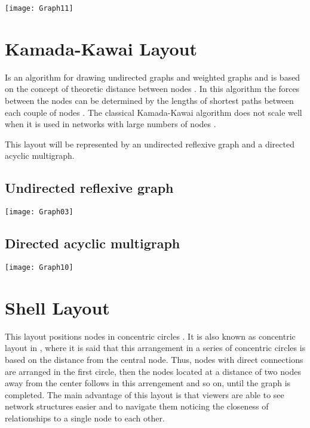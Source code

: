 \documentclass[10pt,a4paper,openany]{article}
\begin{document}
	
	
	\begin{center}
		\texttt{[image: Graph11]}
	\end{center}
	
\newpage	
	
	\section*{Kamada-Kawai Layout}
	Is an algorithm for drawing undirected graphs and weighted graphs and is based on the concept of theoretic distance between nodes \citep{kamada1989algorithm}. In this algorithm the forces between the nodes can be determined by the lengths of shortest paths between each couple of nodes \citep{networkx}. The classical Kamada-Kawai algorithm does not scale well when it is used in networks with large numbers of nodes \citep{DBLP:journals/corr/CheongS15}.
	
	This layout will be represented by an undirected reflexive graph and a directed acyclic multigraph.
	
		\subsection*{Undirected reflexive graph}
		
	
		\begin{center}
			\texttt{[image: Graph03]}
		\end{center}
	
	\newpage
	
		\subsection*{Directed acyclic multigraph}
		

		\begin{center}
			\texttt{[image: Graph10]}
		\end{center}
	
	
\newpage
	
	\section*{Shell Layout}
	This layout positions nodes in concentric circles \citep{networkx}. It is also known as concentric layout in \citep{cherven2015mastering}, where it is said that this arrangement in a series of concentric circles is based on the distance from the central node. Thus, nodes with direct connections are arranged in the first circle, then the nodes located at a distance of two nodes away from the center follows in this arrengement and so on, until the graph is completed. The main advantage of this layout is that viewers are able to see network structures easier and to navigate them noticing the closeness of relationships to a single node to each other.
	
\end{document}
